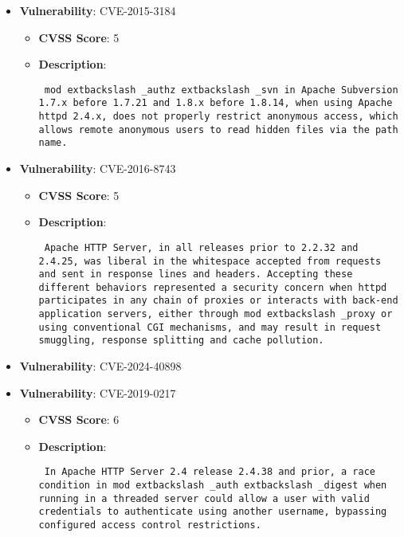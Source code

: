 \documentclass{article}
\begin{document}
\begin{itemize}
        \item \textbf{Vulnerability}: CVE-2015-3184
        \begin{itemize}
            \item \textbf{CVSS Score}:  5 
            \item \textbf{Description}: \parbox{\linewidth}{\texttt{ mod	extbackslash _authz	extbackslash _svn in Apache Subversion 1.7.x before 1.7.21 and 1.8.x before 1.8.14, when using Apache httpd 2.4.x, does not properly restrict anonymous access, which allows remote anonymous users to read hidden files via the path name. }}
        \end{itemize}
    
        \item \textbf{Vulnerability}: CVE-2016-8743
        \begin{itemize}
            \item \textbf{CVSS Score}:  5 
            \item \textbf{Description}: \parbox{\linewidth}{\texttt{ Apache HTTP Server, in all releases prior to 2.2.32 and 2.4.25, was liberal in the whitespace accepted from requests and sent in response lines and headers. Accepting these different behaviors represented a security concern when httpd participates in any chain of proxies or interacts with back-end application servers, either through mod	extbackslash _proxy or using conventional CGI mechanisms, and may result in request smuggling, response splitting and cache pollution. }}
        \end{itemize}
    
        \item \textbf{Vulnerability}: CVE-2024-40898
    
        \item \textbf{Vulnerability}: CVE-2019-0217
        \begin{itemize}
            \item \textbf{CVSS Score}:  6 
            \item \textbf{Description}: \parbox{\linewidth}{\texttt{ In Apache HTTP Server 2.4 release 2.4.38 and prior, a race condition in mod	extbackslash _auth	extbackslash _digest when running in a threaded server could allow a user with valid credentials to authenticate using another username, bypassing configured access control restrictions. }}
        \end{itemize}
    

\end{itemize}
\end{document}

